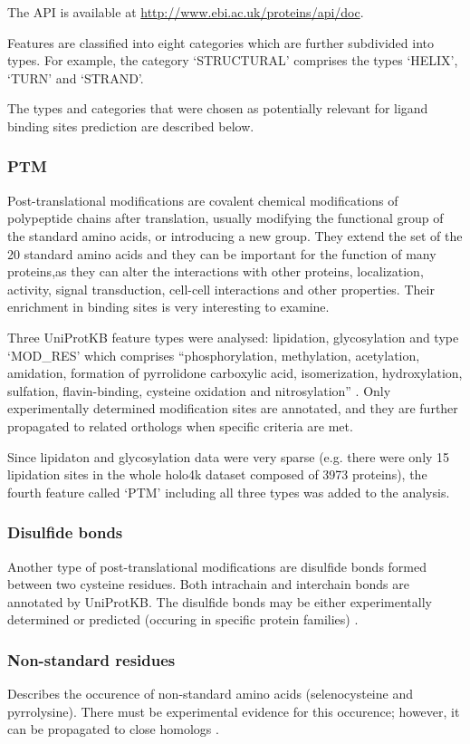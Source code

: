 The API is available at \url{http://www.ebi.ac.uk/proteins/api/doc}.

Features are classified into eight categories which are further subdivided into types. For example, the category `STRUCTURAL' comprises the types `HELIX', `TURN' and `STRAND'.

The types and categories that were chosen as potentially relevant for ligand binding sites prediction are described below.


\subsubsection{PTM}
Post-translational modifications are covalent chemical modifications of polypeptide chains after translation, usually modifying the functional group of the standard amino acids, or introducing a new group. They extend the set of the 20 standard amino acids and they can be important for the function of many proteins,as they can alter the interactions with other proteins, localization, activity, signal transduction, cell-cell interactions and other properties. Their enrichment in binding sites is very interesting to examine.

Three UniProtKB feature types were analysed: lipidation, glycosylation and type `MOD\_RES' which comprises ``phosphorylation, methylation, acetylation, amidation, formation of pyrrolidone carboxylic acid, isomerization, hydroxylation, sulfation, flavin-binding, cysteine oxidation and nitrosylation'' \cite{mod_res}. Only experimentally determined modification sites are annotated, and they are further propagated to related orthologs when specific criteria are met.

Since lipidaton and glycosylation data were very sparse (e.g. there were only 15 lipidation sites in the whole holo4k dataset composed of 3973 proteins), the fourth feature called `PTM' including all three types was added to the analysis.

\subsubsection{Disulfide bonds}
Another type of post-translational modifications are disulfide bonds formed between two cysteine residues. Both intrachain and interchain bonds are annotated by \mbox{UniProtKB}. The disulfide bonds may be either experimentally determined or predicted (occuring in specific protein families) \cite{disulfid}.

\subsubsection{Non-standard residues}
Describes the occurence of non-standard amino acids (selenocysteine and pyrrolysine). There must be experimental evidence for this occurence; however, it can be propagated to close homologs \cite{non_std}.

